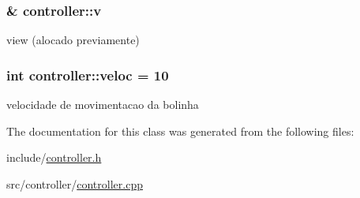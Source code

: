 \subsubsection[{\texorpdfstring{v}{v}}]{\& controller\+::v\hspace{0.3cm}{\ttfamily [private]}}\hypertarget{classcontroller_a6ff845413a797ed4beff34d3cb6b7774}{}\label{classcontroller_a6ff845413a797ed4beff34d3cb6b7774}
view (alocado previamente) 
\subsubsection[{\texorpdfstring{veloc}{veloc}}]{\setlength{\rightskip}{0pt plus 5cm}int controller\+::veloc = 10\hspace{0.3cm}{\ttfamily [private]}}\hypertarget{classcontroller_ae1229353be5404b8decda1e8775292c4}{}\label{classcontroller_ae1229353be5404b8decda1e8775292c4}
velocidade de movimentacao da bolinha 

The documentation for this class was generated from the following files\+:\begin{DoxyCompactItemize}
\item 
include/\hyperlink{controller_8h}{controller.\+h}\item 
src/controller/\hyperlink{controller_8cpp}{controller.\+cpp}\end{DoxyCompactItemize}
